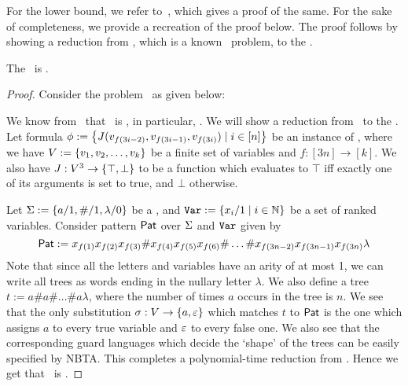 For the lower bound, we refer to~\cite{matchingProblemLowerBound}, which gives a proof of the same. For the sake of completeness, we provide a recreation of the proof below. The proof follows by showing a reduction from \oneInThreeSatFull, which is a known \npc\ problem\cite{oneInThreeSatIsNpHard}, to the \matchingProblemFull. 

\begin{theorem}\label{thm:matchingProblemLowerBound}
    The \matchingProblemFull\ is \nph.
\end{theorem}

\begin{proof}
    Consider the problem \oneInThreeSatFull\ as given below:
    \begin{problem}
        \problemtitle{\oneInThreeSatFull}
    \end{problem}

    We know from~\cite{oneInThreeSatIsNpHard} that \oneInThreeSatFull\ is \npc, in particular, \nph. We will show a reduction from \oneInThreeSatFull\ to the \matchingProblemFull. Let formula $\phi := \left\{ J(v_{f(3i-2)}, v_{f(3i-1)}, v_{f(3i)}) \mid i \in [n] \right\}$ be an instance of \oneInThreeSatFull, where we have $V := \left\{ v_1, v_2, \dots, v_k \right\}$ be a finite set of variables and $f : [3n] \to [k]$. We also have $J : V^3 \to \left\{ \top, \bot \right\}$ to be a function which evaluates to $\top$ iff exactly one of its arguments is set to true, and $\bot$ otherwise.

    Let $\Sigma := \left\{ a/1, \#/1, \lambda/0 \right\}$ be a \rab, and $\texttt{Var} := \left\{ x_i/1 \mid i \in \mathbb{N} \right\}$ be a set of ranked variables. Consider pattern $\mathsf{Pat}$ over $\Sigma$ and $\texttt{Var}$ given by
    \[ \mathsf{Pat} := x_{f(1)}x_{f(2)}x_{f(3)}\#x_{f(4)}x_{f(5)}x_{f(6)}\#\dots\#x_{f(3n-2)}x_{f(3n-1)}x_{f(3n)}\lambda \]
    Note that since all the letters and variables have an arity of at most 1, we can write all trees as words ending in the nullary letter $\lambda$. We also define a tree $t := a\#a\#\dots\#a\lambda$, where the number of times $a$ occurs in the tree is $n$. We see that the only substitution $\sigma : V \to \left\{ a, \varepsilon \right\}$ which matches $t$ to $\mathsf{Pat}$ is the one which assigns $a$ to every true variable and $\varepsilon$ to every false one. We also see that the corresponding guard languages which decide the `shape' of the trees can be easily specified by NBTA.
    This completes a polynomial-time reduction from \oneInThreeSatFull. Hence we get that \matchingProblemFull\ is \nph.
\end{proof}

